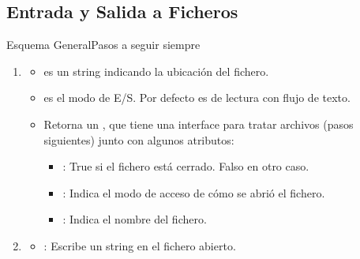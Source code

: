 \documentclass[10pt, envcountsect , spanish]{beamer}
\begin{document}
\subsection{Entrada y Salida a Ficheros}


\begin{frame}{Esquema General}{Pasos a seguir siempre}




\begin{enumerate}
\item {} 
	\begin{itemize}
	\item 
	 es un string indicando la ubicación del fichero.
	
	\item 
	 es el modo de E/S. Por defecto es de lectura con flujo de texto.
	
	\item 
	Retorna un , que tiene una interface para tratar archivos (pasos siguientes) junto con algunos  atributos:
		\begin{itemize}
		
		\item 
		: True si el fichero está cerrado. Falso en otro caso.
		
		\item 
		: Indica el modo de acceso de cómo se abrió el fichero.
		
		\item 
		: Indica el nombre del fichero.
		
		\end{itemize}
	\end{itemize}
	
\item {}

	\begin{itemize}
	\item 
	: Escribe un string en el fichero abierto.
	

\end{itemize}
\end{enumerate}
\end{frame}
\end{document}

